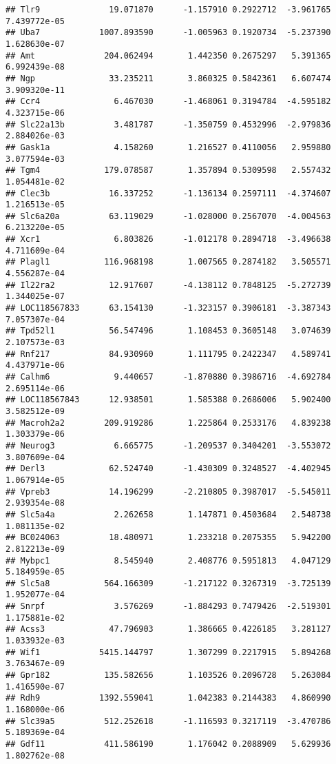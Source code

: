 \documentclass[
]{article}
\begin{document}
\begin{verbatim}
## Tlr9              19.071870      -1.157910 0.2922712  -3.961765 7.439772e-05
## Uba7            1007.893590      -1.005963 0.1920734  -5.237390 1.628630e-07
## Amt              204.062494       1.442350 0.2675297   5.391365 6.992439e-08
## Ngp               33.235211       3.860325 0.5842361   6.607474 3.909320e-11
## Ccr4               6.467030      -1.468061 0.3194784  -4.595182 4.323715e-06
## Slc22a13b          3.481787      -1.350759 0.4532996  -2.979836 2.884026e-03
## Gask1a             4.158260       1.216527 0.4110056   2.959880 3.077594e-03
## Tgm4             179.078587       1.357894 0.5309598   2.557432 1.054481e-02
## Clec3b            16.337252      -1.136134 0.2597111  -4.374607 1.216513e-05
## Slc6a20a          63.119029      -1.028000 0.2567070  -4.004563 6.213220e-05
## Xcr1               6.803826      -1.012178 0.2894718  -3.496638 4.711609e-04
## Plagl1           116.968198       1.007565 0.2874182   3.505571 4.556287e-04
## Il22ra2           12.917607      -4.138112 0.7848125  -5.272739 1.344025e-07
## LOC118567833      63.154130      -1.323157 0.3906181  -3.387343 7.057307e-04
## Tpd52l1           56.547496       1.108453 0.3605148   3.074639 2.107573e-03
## Rnf217            84.930960       1.111795 0.2422347   4.589741 4.437971e-06
## Calhm6             9.440657      -1.870880 0.3986716  -4.692784 2.695114e-06
## LOC118567843      12.938501       1.585388 0.2686006   5.902400 3.582512e-09
## Macroh2a2        209.919286       1.225864 0.2533176   4.839238 1.303379e-06
## Neurog3            6.665775      -1.209537 0.3404201  -3.553072 3.807609e-04
## Derl3             62.524740      -1.430309 0.3248527  -4.402945 1.067914e-05
## Vpreb3            14.196299      -2.210805 0.3987017  -5.545011 2.939354e-08
## Slc5a4a            2.262658       1.147871 0.4503684   2.548738 1.081135e-02
## BC024063          18.480971       1.233218 0.2075355   5.942200 2.812213e-09
## Mybpc1             8.545940       2.408776 0.5951813   4.047129 5.184959e-05
## Slc5a8           564.166309      -1.217122 0.3267319  -3.725139 1.952077e-04
## Snrpf              3.576269      -1.884293 0.7479426  -2.519301 1.175881e-02
## Acss3             47.796903       1.386665 0.4226185   3.281127 1.033932e-03
## Wif1            5415.144797       1.307299 0.2217915   5.894268 3.763467e-09
## Gpr182           135.582656       1.103526 0.2096728   5.263084 1.416590e-07
## Rdh9            1392.559041       1.042383 0.2144383   4.860990 1.168000e-06
## Slc39a5          512.252618      -1.116593 0.3217119  -3.470786 5.189369e-04
## Gdf11            411.586190       1.176042 0.2088909   5.629936 1.802762e-08

\end{verbatim}
\end{document}
